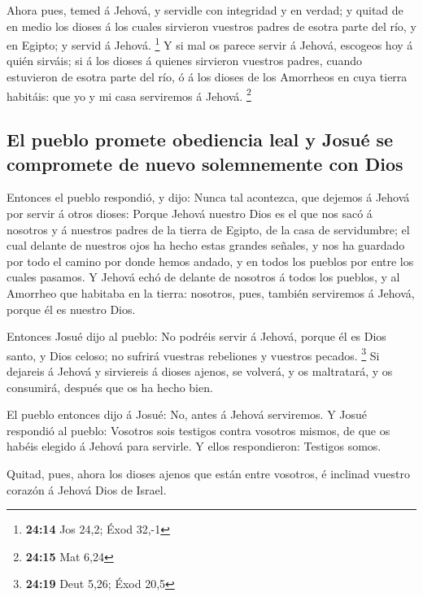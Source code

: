  Ahora pues, temed á Jehová, y servidle con integridad y
en verdad; y quitad de en medio los dioses á los cuales sirvieron
vuestros padres de esotra parte del río, y en Egipto; y servid á Jehová.
\footnote{\textbf{24:14} Jos 24,2; Éxod 32,-1}  Y si mal
os parece servir á Jehová, escogeos hoy á quién sirváis; si á los dioses
á quienes sirvieron vuestros padres, cuando estuvieron de esotra parte
del río, ó á los dioses de los Amorrheos en cuya tierra habitáis: que yo
y mi casa serviremos á Jehová. \footnote{\textbf{24:15} Mat 6,24}

\hypertarget{el-pueblo-promete-obediencia-leal-y-josuuxe9-se-compromete-de-nuevo-solemnemente-con-dios}{%
\subsection{El pueblo promete obediencia leal y Josué se compromete de
nuevo solemnemente con
Dios}\label{el-pueblo-promete-obediencia-leal-y-josuuxe9-se-compromete-de-nuevo-solemnemente-con-dios}}

 Entonces el pueblo respondió, y dijo: Nunca tal
acontezca, que dejemos á Jehová por servir á otros dioses:
 Porque Jehová nuestro Dios es el que nos sacó á nosotros
y á nuestros padres de la tierra de Egipto, de la casa de servidumbre;
el cual delante de nuestros ojos ha hecho estas grandes señales, y nos
ha guardado por todo el camino por donde hemos andado, y en todos los
pueblos por entre los cuales pasamos.  Y Jehová echó de
delante de nosotros á todos los pueblos, y al Amorrheo que habitaba en
la tierra: nosotros, pues, también serviremos á Jehová, porque él es
nuestro Dios.

 Entonces Josué dijo al pueblo: No podréis servir á
Jehová, porque él es Dios santo, y Dios celoso; no sufrirá vuestras
rebeliones y vuestros pecados. \footnote{\textbf{24:19} Deut 5,26; Éxod
  20,5}  Si dejareis á Jehová y sirviereis á dioses
ajenos, se volverá, y os maltratará, y os consumirá, después que os ha
hecho bien.

 El pueblo entonces dijo á Josué: No, antes á Jehová
serviremos.  Y Josué respondió al pueblo: Vosotros sois
testigos contra vosotros mismos, de que os habéis elegido á Jehová para
servirle. Y ellos respondieron: Testigos somos.

 Quitad, pues, ahora los dioses ajenos que están entre
vosotros, é inclinad vuestro corazón á Jehová Dios de Israel.

